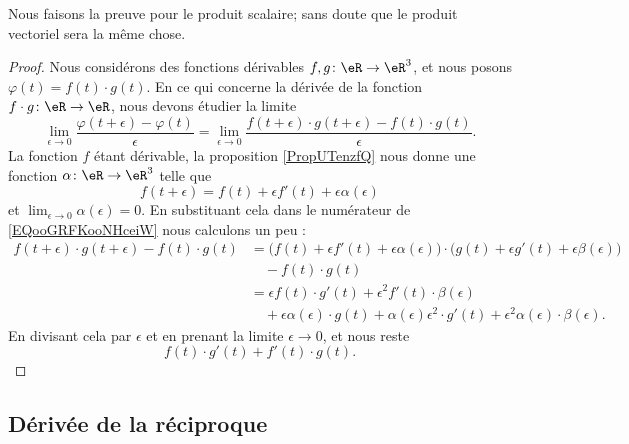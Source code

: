 Nous faisons la preuve pour le produit scalaire; sans doute que le produit vectoriel sera la même chose.
\begin{proof}
    Nous considérons des fonctions dérivables \( f,g\colon \eR\to \eR^3\), et nous posons \( \varphi(t)=f(t)\cdot g(t)\). En ce qui concerne la dérivée de la fonction \( f\cdot g\colon \eR\to \eR\), nous devons étudier la limite
    \begin{equation}        \label{EQooGRFKooNHceiW}
        \lim_{\epsilon\to 0}\frac{ \varphi(t+\epsilon)-\varphi(t) }{ \epsilon }=\lim_{\epsilon\to 0}\frac{ f(t+\epsilon)\cdot g(t+\epsilon)-f(t)\cdot g(t) }{ \epsilon }.
    \end{equation}
    La fonction \( f\) étant dérivable, la proposition \ref{PropUTenzfQ} nous donne une fonction \( \alpha\colon \eR\to \eR^3\) telle que
    \begin{equation}
        f(t+\epsilon)=f(t)+\epsilon f'(t)+\epsilon\alpha(\epsilon)
    \end{equation}
    et \( \lim_{\epsilon\to 0}\alpha(\epsilon)=0\). En substituant cela dans le numérateur de \eqref{EQooGRFKooNHceiW} nous calculons un peu :
    \begin{subequations}
        \begin{align}
            f(t+\epsilon)\cdot g(t+\epsilon)-f(t)\cdot g(t)&=\big( f(t)+\epsilon f'(t)+\epsilon \alpha(\epsilon) \big)\cdot\big( g(t)+\epsilon g'(t)+\epsilon\beta(\epsilon) \big)\\
            &\quad - f(t)\cdot g(t)\\
            &=\epsilon f(t)\cdot g'(t)+\epsilon^2 f'(t)\cdot \beta(\epsilon)\\
            &\quad+\epsilon\alpha(\epsilon)\cdot g(t)+\alpha(\epsilon)\epsilon^2\cdot g'(t)+\epsilon^2\alpha(\epsilon)\cdot \beta(\epsilon).
        \end{align}
    \end{subequations}
    En divisant cela par \( \epsilon\) et en prenant la limite \( \epsilon\to 0\), et nous reste
    \begin{equation}
        f(t)\cdot g'(t)+f'(t)\cdot g(t).
    \end{equation}
\end{proof}

\subsection{Dérivée de la réciproque}


